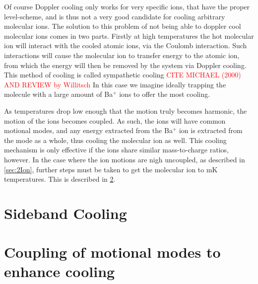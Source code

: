 Of course Doppler cooling only works for very specific ions, that have the proper level-scheme, and is thus not a very good candidate for cooling arbitrary molecular ions.
The solution to this problem of not being able to doppler cool molecular ions comes in two parts. Firstly at high temperatures the hot molecular ion will interact with the cooled atomic ions, via the Coulomb interaction. Such interactions will cause the molecular ion to transfer energy to the atomic ion, from which the energy will then be removed by the system via Doppler cooling. This method of cooling is called sympathetic cooling \textcolor{red}{CITE MICHAEL (2000) AND REVIEW by Willitsch}
In this case we imagine ideally trapping the molecule with a large amount of Ba$^+$ ions to offer the most cooling.

As temperatures drop low enough that the motion truly becomes harmonic, the motion of the ions becomes coupled. As such, the ions will have common motional modes, and any energy extracted from the Ba$^+$ ion is extracted from the mode as a whole, thus cooling the molecular ion as well.
This cooling mechanism is only effective if the ions share similar mass-to-charge ratios, however. In the case where the ion motions are nigh uncoupled, as described in \cref{sec:2Ion}, further steps must be taken to get the molecular ion to mK temperatures. This is described in \cref{sec:Coupling}.


\section{Sideband Cooling}
\label{sec:SBC}
\section{Coupling of motional modes to enhance cooling}
\label{sec:Coupling}